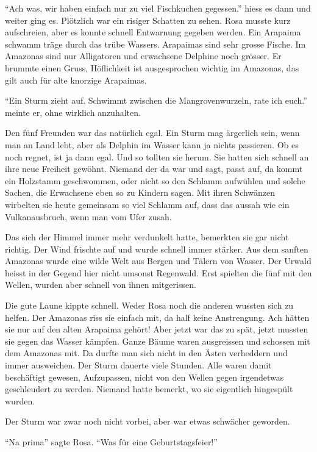 \enquote{Ach was, wir haben einfach nur zu viel Fischkuchen gegessen.} hiess es dann und weiter ging es. Plötzlich war ein risiger Schatten zu sehen. Rosa musste kurz aufschreien, aber es konnte schnell Entwarnung gegeben werden. Ein Arapaima schwamm träge durch das trübe Wassers. Arapaimas sind sehr grosse Fische. Im Amazonas sind nur Alligatoren und erwachsene Delphine noch grösser. Er brummte einen Gruss, Höflichkeit ist ausgesprochen wichtig im Amazonas, das gilt auch für alte knorzige Arapaimas.

\enquote{Ein Sturm zieht auf. Schwimmt zwischen die Mangrovenwurzeln, rate ich euch.} meinte er, ohne wirklich anzuhalten. 

Den fünf Freunden war das natürlich egal. Ein Sturm mag ärgerlich sein, wenn man an Land lebt, aber als Delphin im Wasser kann ja nichts passieren. Ob es noch regnet, ist ja dann egal. Und so tollten sie herum. Sie hatten sich schnell an ihre neue Freiheit gewöhnt. Niemand der da war und sagt, passt auf, da kommt ein Holzstamm geschwommen, oder nicht so den Schlamm aufwühlen und solche Sachen, die Erwachsene eben so zu Kindern sagen. Mit ihren Schwänzen wirbelten sie heute gemeinsam so viel Schlamm auf, dass das aussah wie ein Vulkanausbruch, wenn man vom Ufer zusah.

Das sich der Himmel immer mehr verdunkelt hatte, bemerkten sie gar nicht richtig. Der Wind frischte auf und wurde schnell immer stärker. Aus dem sanften Amazonas wurde eine wilde Welt aus Bergen und Tälern von Wasser. Der Urwald heisst in der Gegend hier nicht umsonst Regenwald. Erst spielten die fünf mit den Wellen, wurden aber schnell von ihnen mitgerissen.

Die gute Laune kippte schnell. Weder Rosa noch die anderen wussten sich zu helfen. Der Amazonas riss sie einfach mit, da half keine Anstrengung. Ach hätten sie nur auf den alten Arapaima gehört! Aber jetzt war das zu spät, jetzt mussten sie gegen das Wasser kämpfen. Ganze Bäume waren ausgreissen und schossen mit dem Amazonas mit. Da durfte man sich nicht in den Ästen verheddern und immer ausweichen. Der Sturm dauerte viele Stunden. Alle waren damit beschäftigt gewesen, Aufzupassen, nicht von den Wellen gegen irgendetwas geschleudert zu werden. Niemand hatte bemerkt, wo sie eigentlich hingespült wurden.

Der Sturm war zwar noch nicht vorbei, aber war etwas schwächer geworden. 

\enquote{Na prima} sagte Rosa. \enquote{Was für eine Geburtstagsfeier!}

